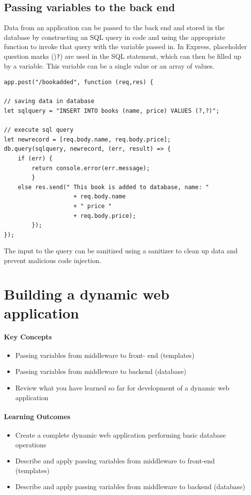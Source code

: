 \subsection{Passing variables to the back end}
Data from an application can be passed to the back end and stored in the database by constructing an SQL query in code and using the appropriate function to invoke that query with the variable passed in. In Express, placeholder question marks ()\texttt{?}) are used in the SQL statement, which can then be filled up by a variable. This variable can be a single value or an array of values.

\begin{verbatim}
app.post("/bookadded", function (req,res) {

// saving data in database
let sqlquery = "INSERT INTO books (name, price) VALUES (?,?)";

// execute sql query
let newrecord = [req.body.name, req.body.price];
db.query(sqlquery, newrecord, (err, result) => {
	if (err) {
		return console.error(err.message);
		}
	else res.send(" This book is added to database, name: "
					+ req.body.name 
					+ " price "
					+ req.body.price);
		});
});
\end{verbatim}

The input to the query can be sanitized using a sanitizer to clean up data and prevent malicious code injection.

\section{Building a dynamic web application}

\begin{mdframed}
\paragraph{Key Concepts}
\begin{itemize}[label={\checkmark}]
\item Passing variables from middleware to front- end (templates)
\item Passing variables from middleware to backend (database)
\item Review what you have learned so far for development of a dynamic web application
\end{itemize}

\paragraph{Learning Outcomes}
\begin{itemize}[label={\checkmark}]
\item Create a complete dynamic web application performing basic database operations
\item Describe and apply passing variables from middleware to front-end (templates)
\item Describe and apply passing variables from middleware to backend (database)
\end{itemize}
\end{mdframed}

